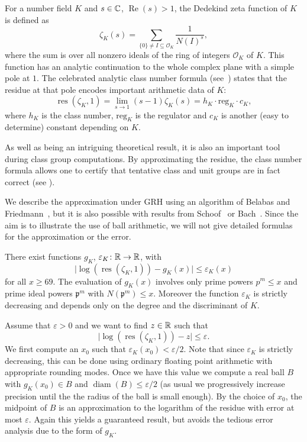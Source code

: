 \documentclass{sig-alternate-05-2015}
\begin{document}
For a number field $K$ and $s \in \mathbb{C}$, $\operatorname{Re}(s) > 1$, the Dedekind zeta function of $K$ is defined as
\[ \zeta_K(s) = \sum_{\{0\} \neq I \subseteq \mathcal O_K} \frac 1 {N(I)^s}, \]
where the sum is over all nonzero ideals of the ring of integers $\mathcal O_K$ of $K$.
This function has an analytic continuation to the whole complex plane with a simple pole at $1$. The celebrated analytic class number formula
(see~\cite{Cohen1993}) states that the residue at that pole encodes important arithmetic data of $K$:
\[ \operatorname{res}(\zeta_K, 1) =\lim_{s \to 1}(s - 1)\zeta_K(s) = h_K \cdot \mathrm{reg}_K \cdot c_K, \]
where $h_K$ is the class number, $\mathrm{reg}_K$ is the regulator and $c_K$ is another (easy to determine) constant depending on $K$.

As well as being an intriguing theoretical result, it is also an important tool during class group computations.
By approximating the residue, the class number formula allows one to certify that tentative class and unit groups are in fact
correct (see \cite{Biasse2014}).

We describe the approximation under GRH using an algorithm of Belabas and Friedmann~\cite{Belabas2015}, but it is also possible with
results from Schoof~\cite{Schoof1982} or Bach~\cite{Bach1995}.
Since the aim is to illustrate the use of ball arithmetic, we will not give detailed formulas for the approximation or the error.

\begin{theorem}
There exist functions $g_K$, $\varepsilon_K \colon \mathbb{R} \to \mathbb{R}$, with
\[ \lvert \log(\operatorname{res}(\zeta_K, 1)) - g_K(x) \rvert \leq \varepsilon_K(x) \]
for all $x \geq 69$. The evaluation of $g_K(x)$ involves only prime powers $p^m \leq x$ and prime ideal powers $\mathfrak p^m$ with
$N(\mathfrak p^m) \leq x$. Moreover the function $\varepsilon_K$ is strictly decreasing and depends only on the degree and the
discriminant of $K$.
\end{theorem}

Assume that $\varepsilon > 0$ and we want to find $z \in \mathbb{R}$ such that
\[ \lvert \log(\operatorname{res}(\zeta_K, 1)) - z \rvert \leq \varepsilon.\]
We first compute an $x_0$ such that $\varepsilon_K(x_0) < \varepsilon/2$. Note that since $\varepsilon_K$ is strictly decreasing,
this can be done using ordinary floating point arithmetic with appropriate rounding modes.
Once we have this value we compute a real ball $B$ with $g_K(x_0) \in B$ and $\operatorname{diam}(B) \leq \varepsilon/2$ (as usual
we progressively increase precision until the the radius of the ball is small enough).
By the choice of $x_0$, the midpoint of $B$ is an approximation to the logarithm of the residue with error at most $\varepsilon$.
Again this yields a guaranteed result, but avoids the tedious error analysis due to the form of $g_K$.
\end{document}
